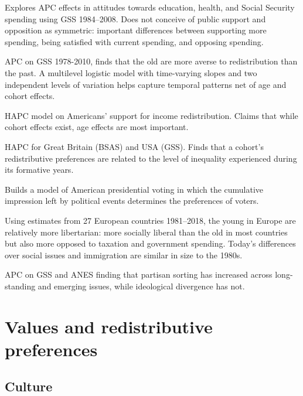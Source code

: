 \documentclass{article}
\newcommand{\citem}[1]{\medskip \noindent \textbf{\cite*{#1}}}
\begin{document}
Explores APC effects in attitudes towards education, health, and Social Security spending using GSS 1984--2008. Does not conceive of public support and opposition as symmetric: important differences between supporting more spending, being satisfied with current spending, and opposing spending.

\citem{pittau2016attitude}

APC on GSS 1978-2010, finds that the old are more averse to redistribution than the past. A multilevel logistic model with time-varying slopes and two independent levels of variation helps capture temporal patterns net of age and cohort effects.

\citem{lin2018government}

HAPC model on Americans' support for income redistribution. Claims that while cohort effects exist, age effects are most important.

\citem{meuleman2019economic}

HAPC for Great Britain (BSAS) and USA (GSS). Finds that a cohort’s
redistributive preferences are related to the level of inequality experienced during its formative years.

\citem{ghitza2023great}

Builds a model of American presidential voting in which the cumulative impression left by political events determines the preferences of voters.

\citem{ogrady2023ideological}

Using estimates from 27 European countries 1981--2018, the young in Europe are relatively more libertarian: more socially liberal than the old in
most countries but also more opposed to taxation and government spending. Today’s differences over social issues and immigration are similar in size to the 1980s.

\citem{jocker2024growing}

APC on GSS and ANES finding that partisan sorting has increased across long-standing and emerging issues, while ideological divergence has not.





\section{Values and redistributive preferences}

\subsection{Culture}
\end{document}
